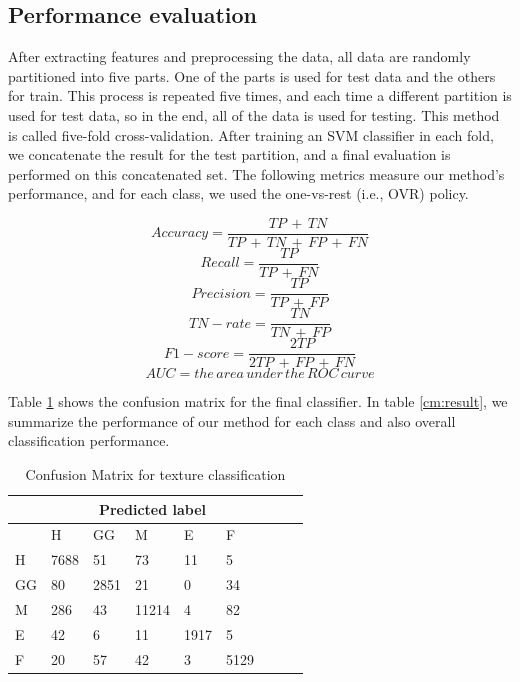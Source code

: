 \documentclass[conference]{IEEEtran}
\begin{document}
\subsection{\textbf{Performance evaluation}}
After extracting features and preprocessing the data, all data are randomly partitioned into five parts. One of the parts is used for test data and the others for train. This process is repeated five times, and each time a different partition is used for test data, so in the end, all of the data is used for testing. This method is called five-fold cross-validation. After training an SVM classifier in each fold, we concatenate the result for the test partition, and a final evaluation is performed on this concatenated set. The following metrics measure our method's performance, and for each class, we used the one-vs-rest (i.e., OVR) policy.


\small \begin{equation}
Accuracy = \frac{TP\,+\,TN}{TP\,+\,TN\,+\,FP\,+\,FN}
\end{equation}
\small \begin{equation}
Recall = \frac{TP}{TP\,+\,FN}
\end{equation}
\small \begin{equation}
Precision = \frac{TP}{TP\,+\,FP}
\end{equation}
\small \begin{equation}
TN-rate = \frac{TN}{TN\,+\,FP}
\end{equation}
\small \begin{equation}
F1-score = \frac{2TP}{2TP\,+\,FP\,+\,FN}
\end{equation}
\small \begin{equation}
AUC = the\,area\,under\, the\, ROC\, curve 
\end{equation}

Table \ref{cm:CM} shows the confusion matrix for the final classifier. In table \ref{cm:result}, we summarize the performance of our method for each class and also overall classification performance.



\begin{table}[tbh]
\caption{Confusion Matrix for texture classification}
\label{cm:CM}
\small
\centering
\begin{tabular}{@{}lllllllll@{}}
&& \multicolumn{3}{c}{Predicted label}\\
\toprule
 & H & GG & M & E & F \\ \midrule
 
H& 7688 & 51 & 73 & 11 & 5 \\ 
GG& 80 & 2851 & 21 & 0 & 34 \\ 
M& 286 & 43 & 11214 & 4 & 82 \\ 
E& 42 & 6 & 11 & 1917 & 5 \\ 
F& 20 & 57 & 42 & 3 & 5129 \\ \bottomrule

\end{tabular}
\end{table}
\end{document}
